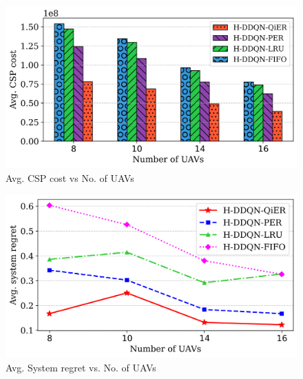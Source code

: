 \documentclass[journal]{IEEEtran}
\begin{document}
\begin{figure}[htbp]
    \centering
    \includegraphics[width=\linewidth]{MinMax Cost Scaled/avg_cost_vs_uavs_bar.png}  %
    \caption{Avg. CSP cost vs No. of UAVs}
    \label{fig:avg_cost_vs_uavs}
\end{figure}
\begin{figure}[htbp]
    \centering
    \includegraphics[width=\linewidth]{MinMax Cost Scaled/avg_Systemregret_vs_uavs_line.png}  %
    \caption{Avg. System regret vs. No. of UAVs}
    \label{fig:avg_system_regret_vs_uavs}
\end{figure}
\end{document}
